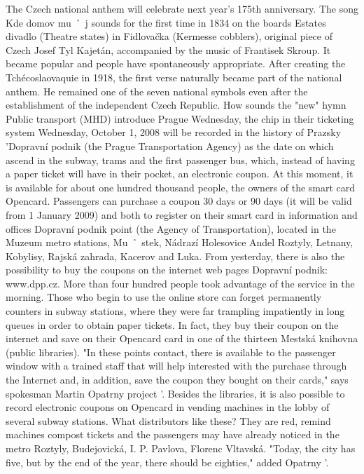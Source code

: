 The Czech national anthem will celebrate next year's 175th anniversary.
The song Kde domov mu ˚ j sounds for the first time in 1834 on the boards Estates divadlo (Theatre states) in Fidlovačka (Kermesse cobblers), original piece of Czech Josef Tyl Kajetán, accompanied by the music of Frantisek Skroup.
It became popular and people have spontaneously appropriate.
After creating the Tchécoslaovaquie in 1918, the first verse naturally became part of the national anthem.
He remained one of the seven national symbols even after the establishment of the independent Czech Republic.
How sounds the "new" hymn
Public transport (MHD) introduce Prague Wednesday, the chip in their ticketing system
Wednesday, October 1, 2008 will be recorded in the history of Prazsky 'Dopravní podnik (the Prague Transportation Agency) as the date on which ascend in the subway, trams and the first passenger bus, which, instead of having a paper ticket will have in their pocket, an electronic coupon.
At this moment, it is available for about one hundred thousand people, the owners of the smart card Opencard.
Passengers can purchase a coupon 30 days or 90 days (it will be valid from 1 January 2009) and both to register on their smart card in information and offices Dopravní podnik point (the Agency of Transportation), located in the Muzeum metro stations, Mu ˚ stek, Nádrazí Holesovice Andel Roztyly, Letnany, Kobylisy, Rajská zahrada, Kacerov and Luka.
From yesterday, there is also the possibility to buy the coupons on the internet web pages Dopravní podnik: www.dpp.cz.
More than four hundred people took advantage of the service in the morning.
Those who begin to use the online store can forget permanently counters in subway stations, where they were far trampling impatiently in long queues in order to obtain paper tickets.
In fact, they buy their coupon on the internet and save on their Opencard card in one of the thirteen Mestská knihovna (public libraries).
"In these points contact, there is available to the passenger window with a trained staff that will help interested with the purchase through the Internet and, in addition, save the coupon they bought on their cards," says spokesman Martin Opatrny project '.
Besides the libraries, it is also possible to record electronic coupons on Opencard in vending machines in the lobby of several subway stations.
What distributors like these?
They are red, remind machines compost tickets and the passengers may have already noticed in the metro Roztyly, Budejovická, I. P. Pavlova, Florenc Vltavská.
"Today, the city has five, but by the end of the year, there should be eighties," added Opatrny '.
